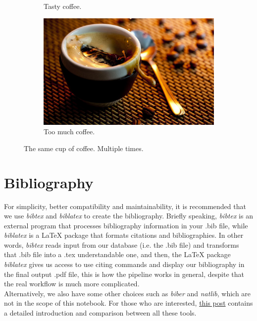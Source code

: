 \documentclass[11pt]{article}  %
\begin{document}
\begin{figure}[h!]
\begin{subfigure}[h]{0.2\linewidth}
          \caption{Tasty coffee.}
        \end{subfigure}
        \begin{subfigure}[h]{0.5\linewidth}  %
          \includegraphics[width=\linewidth]{../resources/coffee.jpg}
          \caption{Too much coffee.}
        \end{subfigure}
        \caption{The same cup of coffee. Multiple times.}
        \label{f3}
      \end{figure}


  \section{Bibliography}
    For simplicity, better compatibility and maintainability, it is recommended that we use \textit{bibtex} and \textit{biblatex} to create the bibliography. Briefly speaking, \textit{bibtex} is an external program that processes bibliography information in your .bib file, while \textit{biblatex} is a LaTeX package that formats citations and bibliographies. In other words, \textit{bibtex} reads input from our database (i.e. the .bib file) and transforms that .bib file into a .tex understandable one, and then, the LaTeX package \textit{biblatex} gives us access to use citing commands and display our bibliography in the final output .pdf file, this is how the pipeline works in general, despite that the real workflow is much more complicated.\\

    Alternatively, we also have some other choices such as \textit{biber} and \textit{natlib}, which are not in the scope of this notebook. For those who are interested, \href{https://tex.stackexchange.com/questions/25701/bibtex-vs-biber-and-biblatex-vs-natbib}{this post} contains a detailed introduction and comparison between all these tools.
\end{document}
